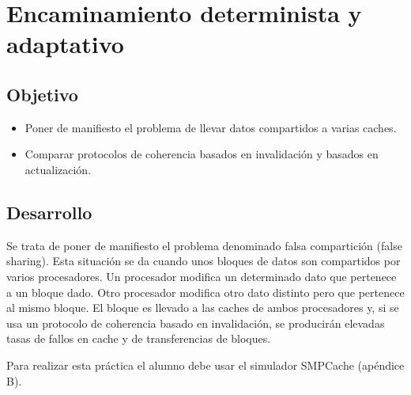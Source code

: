\section{Encaminamiento determinista y adaptativo}\label{sec:p03intro}

\subsection{Objetivo}\label{ssec:p03objetivo}

\begin{itemize}
    \item \normalsize Poner de manifiesto el problema de llevar datos compartidos a varias caches.
    \item \normalsize Comparar protocolos de coherencia basados en invalidación y basados en actualización.
\end{itemize} 

\subsection{Desarrollo}\label{ssec:p03desarrollo}

\normalsize Se trata de poner de manifiesto el problema denominado falsa compartición (false sharing). Esta situación se da cuando unos bloques de datos son compartidos por varios procesadores. Un procesador modifica un determinado dato que pertenece a un bloque dado. Otro procesador modifica otro dato distinto pero que pertenece al mismo bloque. El bloque es llevado a las caches de ambos procesadores y, si se usa un protocolo de coherencia basado en invalidación, se producirán elevadas tasas de fallos en cache y de transferencias de bloques.

Para realizar esta práctica el alumno debe usar el simulador SMPCache (apéndice B).

